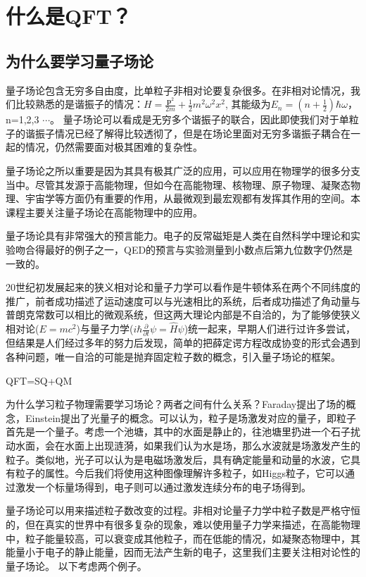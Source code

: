 \chapter{什么是QFT？}
\section{为什么要学习量子场论}
量子场论包含无穷多自由度，比单粒子非相对论要复杂很多。在非相对论情况，我们比较熟悉的是谐振子的情况：$H=\frac{\textbf{p}^{2}}{2m}+\frac{1}{2}m^{2}\omega^{2}x^{2}$,
其能级为$E_{n}=(n+\frac{1}{2})\hbar\omega$，n=1,2,3 $\cdots$。
量子场论可以看成是无穷多个谐振子的联合，因此即使我们对于单粒子的谐振子情况已经了解得比较透彻了，但是在场论里面对无穷多谐振子耦合在一起的情况，仍然需要面对极其困难的复杂性。

量子场论之所以重要是因为其具有极其广泛的应用，可以应用在物理学的很多分支当中。尽管其发源于高能物理，但如今在高能物理、核物理、原子物理、凝聚态物理、宇宙学等方面仍有重要的作用，从最微观到最宏观都有发挥其作用的空间。本课程主要关注量子场论在高能物理中的应用。

量子场论具有非常强大的预言能力。电子的反常磁矩是人类在自然科学中理论和实验吻合得最好的例子之一，QED的预言与实验测量到小数点后第九位数字仍然是一致的。

20世纪初发展起来的狭义相对论和量子力学可以看作是牛顿体系在两个不同纬度的推广，前者成功描述了运动速度可以与光速相比的系统，后者成功描述了角动量与普朗克常数可以相比的微观系统，但这两大理论内部是不自洽的，为了能够使狭义相对论($E=m c^{2}$)与量子力学($i \hbar \frac{\partial}{\partial t}\psi=\hat{H}\psi$)统一起来，早期人们进行过许多尝试，但结果是人们经过多年的努力后发现，简单的把薛定谔方程改成协变的形式会遇到各种问题，唯一自洽的可能是抛弃固定粒子数的概念，引入量子场论的框架。
\begin{center}
QFT=SQ+QM
\end{center}

为什么学习粒子物理需要学习场论？两者之间有什么关系？Faraday提出了场的概念，Einstein提出了光量子的概念。可以认为，粒子是场激发对应的量子，即粒子首先是一个量子。考虑一个池塘，其中的水面是静止的，往池塘里扔进一个石子扰动水面，会在水面上出现涟漪，如果我们认为水是场，那么水波就是场激发产生的粒子。类似地，光子可以认为是电磁场激发后，具有确定能量和动量的水波，它具有粒子的属性。今后我们将使用这种图像理解许多粒子，如Higgs粒子，它可以通过激发一个标量场得到，电子则可以通过激发连续分布的电子场得到。

量子场论可以用来描述粒子数改变的过程。非相对论量子力学中粒子数是严格守恒的，但在真实的世界中有很多复杂的现象，难以使用量子力学来描述，在高能物理中，粒子能量较高，可以衰变成其他粒子，而在低能的情况，如凝聚态物理中，其能量小于电子的静止能量，因而无法产生新的电子，这里我们主要关注相对论性的量子场论。
以下考虑两个例子。

